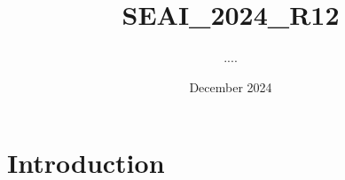 \documentclass{article}
\title{SEAI\_2024\_R12}
\author{....}
\date{December 2024}
\begin{document}
\maketitle

\section{Introduction}
\end{document}

